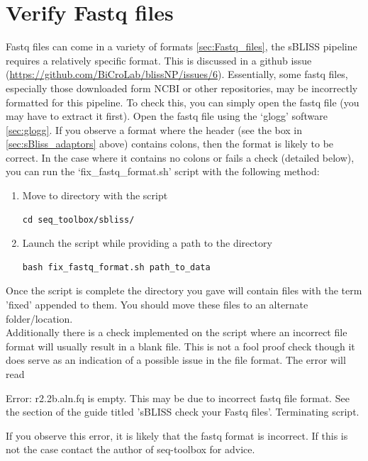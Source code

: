 \section{Verify Fastq files \label{sec:sbliss_check_fastq}}
Fastq files can come in a variety of formats \autoref{sec:Fastq_files}, the sBLISS pipeline requires a relatively specific format. This is discussed in a github issue (\url{https://github.com/BiCroLab/blissNP/issues/6}). Essentially, some fastq files, especially those downloaded form NCBI or other repositories, may be incorrectly formatted for this pipeline. To check this, you can simply open the fastq file (you may have to extract it first). Open the fastq file using the `glogg' software \autoref{sec:glogg}. If you observe a format where the header (see the box in \autoref{sec:sBliss_adaptors} above) contains colons, then the format is likely to be correct. In the case where it contains no colons or fails a check (detailed below), you can run the `fix\_fastq\_format.sh' script with the following method:\\
\begin{enumerate}
\item Move to directory with the script
\begin{lstlisting}
cd seq_toolbox/sbliss/
\end{lstlisting}
\item Launch the script while providing a path to the directory
\begin{lstlisting}
bash fix_fastq_format.sh path_to_data
\end{lstlisting}
\end{enumerate}
Once the script is complete the directory you gave will contain files with the term 'fixed' appended to them. You should move these files to an alternate folder/location.\\
Additionally there is a check implemented on the script where an incorrect file format will usually result in a blank file. This is not a fool proof check though it does serve as an indication of a possible issue in the file format. The error will read
\begin{displayquote}
Error: r2.2b.aln.fq is empty. This may be due to incorrect fastq file format. See the section of the guide titled 'sBLISS check your Fastq files'. Terminating script.
\end{displayquote}
If you observe this error, it is likely that the fastq format is incorrect. If this is not the case contact the author of seq-toolbox for advice.

